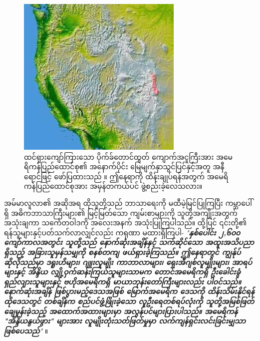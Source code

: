 \documentclass[10pt,twocolumn,letterpaper]{article}
\begin{document}
\begin{figure}[t]
\begin{center}
   \includegraphics[width=1\linewidth]{pike.jpg}
\end{center}
   \caption{ထင်ရှားကျော်ကြားသော ပိုက်ခ်တောင်ထွတ် ကျောက်အငူကြီးအား အမေရိကန်ပြည်ထောင်စု၏ အနောက်ပိုင်း မြေမျက်နှာသွင်ပြင်နှင့်အတူ အနီရောင်ဖြင့် ဖော်ပြထားသည် \cite{36}။ ဤနေရာကို ထိန်းချုပ်ရန်အတွက် အမေရိကန်ပြည်ထောင်စုအား အမှန်တကယ်ပင် ဖွဲ့စည်းခဲ့လေသလား။}
\label{fig:11}
\label{fig:onecol}
\end{figure}

အမ်မာလူလာ၏ အဆိုအရ ထိုသူတို့သည် ဘာသာရေးကို မထီမဲ့မြင်ပြုကြပြီး ကမ္ဘာပေါ်ရှိ အဓိကဘာသာကြီးများ၏ မြင့်မြတ်သော ကျမ်းစာများကို သူတို့အကျိုးအတွက် အသုံးချကာ သင်္ကေတဝါဒကို အလေးအနက် အသုံးပြုကြပါသည်။ ထို့ပြင် ၎င်းတို့၏ ရန်သူများနှင့်ပတ်သက်လာလျှင်လည်း ကရုဏာ မထားရှိကြပါ- \textit{"\textbf{နှစ်ပေါင်း ၂,၆၀၀ ကျော်ကာလအတွင်း သူတို့သည် နောက်ဆုံးအချိန်နှင့် သက်ဆိုင်သော အထူးအသိပညာရှိသည့် အခြားသူမှန်သမျှကို စနစ်တကျ ဖယ်ရှားခဲ့ကြသည်။ ဤနေရာတွင် ကျွန်ုပ်ဆိုလိုသည်မှာ ဒရူးဟိများ၊ ဂျူးလူမျိုး ကာဘာလာများ၊ ရှေးအီဂျစ်လူမျိုးများ၊ အာရပ်များနှင့် အိန္ဒိယ လျှို့ဝှက်ဆန်းကြယ်သူများသာမက တောင်အမေရိကရှိ ဦးခေါင်းခွံ ရှည်လျားသူများနှင့် ဗဟိုအမေရိကရှိ မာယာဘုန်းတော်ကြီးများလည်း ပါဝင်သည်။ နောက်ဆုံးအချိန် ဖြစ်ပွားမည့်ဒေသအဖြစ် မြောက်အမေရိက ဒေသကို ထိန်းသိမ်းနိုင်ရန် ထိုဒေသတွင် တစ်ချိန်က စည်ပင်ဖွံ့ဖြိုးခဲ့သော လူဦးရေတစ်ရပ်လုံးကို သူတို့အမြစ်ဖြတ်ချေမှုန်းခဲ့သည့် အထောက်အထားများမှာ အလွန်ပင်များပြားပါသည်။ အမေရိကန် "အိန္ဒိယနွယ်ဖွား" များအား လူမျိုးတုံးသတ်ဖြတ်မှုမှာ လက်ကျန်ရှင်းလင်းခြင်းမျှသာ ဖြစ်ပေသည်}"} \cite{33,34}။
\end{document}
